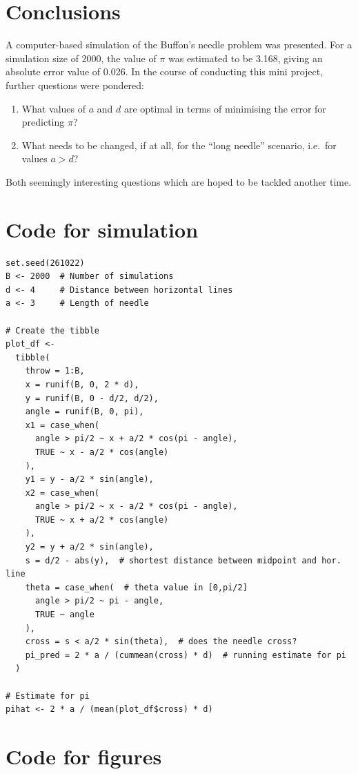 \documentclass[11pt]{article}
\begin{document}
\section{Conclusions}

A computer-based simulation of the Buffon's needle problem was
presented. 
For a simulation size of 2000, the value of \(\pi\) was
estimated to be 3.168, giving an absolute error value of 0.026. 
In the course of conducting this mini project, further questions were pondered:
\begin{enumerate}
\item What values of \(a\) and \(d\) are optimal in terms of minimising the error for predicting \(\pi\)?
\item
  What needs to be changed, if at all, for the ``long needle'' scenario, i.e.~for values \(a > d\)?
\end{enumerate}
Both seemingly interesting questions which are hoped to be tackled another time.

\appendix

\section{Code for simulation}


\begin{verbatim}
set.seed(261022)
B <- 2000  # Number of simulations
d <- 4     # Distance between horizontal lines
a <- 3     # Length of needle

# Create the tibble
plot_df <-
  tibble(
    throw = 1:B,
    x = runif(B, 0, 2 * d),
    y = runif(B, 0 - d/2, d/2),
    angle = runif(B, 0, pi),
    x1 = case_when(
      angle > pi/2 ~ x + a/2 * cos(pi - angle), 
      TRUE ~ x - a/2 * cos(angle)
    ),
    y1 = y - a/2 * sin(angle),
    x2 = case_when(
      angle > pi/2 ~ x - a/2 * cos(pi - angle), 
      TRUE ~ x + a/2 * cos(angle)
    ),
    y2 = y + a/2 * sin(angle),
    s = d/2 - abs(y),  # shortest distance between midpoint and hor. line
    theta = case_when(  # theta value in [0,pi/2]
      angle > pi/2 ~ pi - angle, 
      TRUE ~ angle
    ),
    cross = s < a/2 * sin(theta),  # does the needle cross?
    pi_pred = 2 * a / (cummean(cross) * d)  # running estimate for pi
  )

# Estimate for pi
pihat <- 2 * a / (mean(plot_df$cross) * d)
\end{verbatim}

\section{Code for figures}
\end{document}
